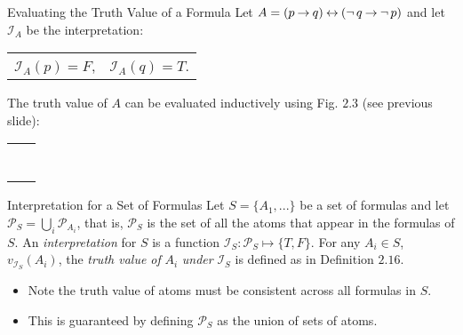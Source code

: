 \documentclass[style=sailor,size=12pt]{powerdot}
\theoremstyle{definition}
\newenvironment{defn}[1]
  {\renewcommand\theinnerdefn{#1}\innerdefn}
  {\endinnerdefn}
\newenvironment{ex}[1]
  {\renewcommand\theinnerexample{#1}\innerexample}
  {\endinnerexample}
\begin{document}
\begin{wideslide}[bm=,toc=]{Evaluating the Truth Value of a Formula}
\begin{ex}{2.17}[Ben Ari]
Let $A = (p \mathbin{\rightarrow} q) \mathbin{\leftrightarrow} (\mathop{\neg} q \mathbin{\rightarrow} \mathop{\neg} p)$ and let $\mathcal{I}_A$ be
the interpretation:
\begin{center}
\begin{tabular}{ c c }
$\mathcal{I}_A(p) = F$, & $\mathcal{I}_A(q) = T$.
\end{tabular}
\end{center}
The truth value of $A$ can be evaluated inductively using Fig. $2.3$ (see previous
    slide):
\begin{center}
\begin{tabular}{ l l }
\onslide{2-}{$v_\mathcal{I}(p)$}                                     & \onslide{3-}{$= \mathcal{I}_A(p) = F$}\\
\onslide{4-}{$v_\mathcal{I}(q)$}                                     & \onslide{5-}{$= \mathcal{I}_A(q) = T$} \\
\onslide{6-}{$v_\mathcal{I}(p \imp q)$}                              & \onslide{7-}{$= T$} \\
\onslide{8-}{$v_\mathcal{I}(\ngg q)$}                                & \onslide{9-}{$= F$} \\
\onslide{10-}{$v_\mathcal{I}(\ngg p)$}                               & \onslide{11-}{$= T$} \\
\onslide{12-}{$v_\mathcal{I}(\ngg q \imp \ngg p)$}                   & \onslide{13-}{$= T$} \\
\onslide{14-}{$v_\mathcal{I}((p \imp q) \eqv (\ngg q \imp \ngg p))$} & \onslide{15-}{$= T$} \\
\end{tabular}
\end{center}\end{ex}
\end{wideslide}

\begin{wideslide}[bm=,toc=]{Interpretation for a Set of Formulas}
\begin{defn}{2.24}[Ben Ari]
Let $S = \{A_1,...\}$ be a set of formulas and let $\mathcal{P}_S = \bigcup_i
\mathcal{P}_{A_i}$, that is, $\mathcal{P}_S$ is the set of all the atoms that
appear in the formulas of $S$. An \emph{interpretation} for $S$ is a function
$\mathcal{I}_S:\mathcal{P}_S \mapsto \{T,F\}$.
\end{defn}
For any $A_i \in S$, $v_{\mathcal{I}_S}(A_i)$, the \emph{truth value of} $A_i$
\emph{under} $\mathcal{I}_S$ is defined as in Definition $2.16$.

\begin{itemize}
\item Note the truth value of atoms must be consistent across all formulas in $S$.
\item This is guaranteed by defining $\mathcal{P}_S$ as the union of sets of
atoms. 
\end{itemize}
\end{wideslide}
\end{document}
